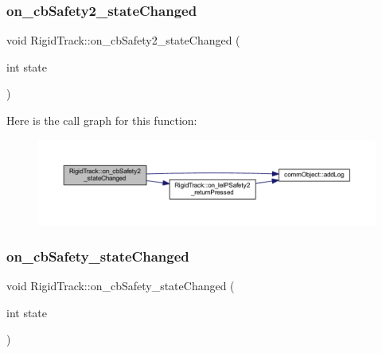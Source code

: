 \mbox{\label{class_rigid_track_ad6ba1cfe25f18ff0d9f5993aafa36d16}} 
\subsubsection{\texorpdfstring{on\+\_\+cb\+Safety2\+\_\+state\+Changed}{on\_cbSafety2\_stateChanged}}
{\footnotesize\ttfamily void Rigid\+Track\+::on\+\_\+cb\+Safety2\+\_\+state\+Changed (\begin{DoxyParamCaption}\item[{int}]{state }\end{DoxyParamCaption})\hspace{0.3cm}{\ttfamily [slot]}}

Here is the call graph for this function\+:\nopagebreak
\begin{figure}[H]
\begin{center}
\leavevmode
\includegraphics[width=350pt]{class_rigid_track_ad6ba1cfe25f18ff0d9f5993aafa36d16_cgraph}
\end{center}
\end{figure}
\mbox{\label{class_rigid_track_a8f999fa968f4cc9fa548bdc8438b32c4}} 
\subsubsection{\texorpdfstring{on\+\_\+cb\+Safety\+\_\+state\+Changed}{on\_cbSafety\_stateChanged}}
{\footnotesize\ttfamily void Rigid\+Track\+::on\+\_\+cb\+Safety\+\_\+state\+Changed (\begin{DoxyParamCaption}\item[{int}]{state }\end{DoxyParamCaption})\hspace{0.3cm}{\ttfamily [slot]}}

